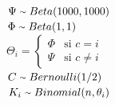 \begin{minipage}[t]{\dimexpr\linewidth-5.5cm\relax}
    \raggedleft{}
\end{minipage}\hfill
\begin{minipage}[t]{0.7\textwidth}
  \begin{flushleft}
  \large
    ~\\
    $\Psi \; {\raise.17ex\hbox{$\scriptstyle\sim$}} \; Beta(1000, 1000)$\vspace*{0.3cm} \\
    $\Phi \; {\raise.17ex\hbox{$\scriptstyle\sim$}} \; Beta(1,1)$\vspace*{0.3cm} \\
    $\Theta_{i} = \left\{
	  \begin{array}{ll}
		  \Phi  & \mbox{si } c = i \\
		  \Psi & \mbox{si } c \neq i
	  \end{array}
    \right.$\vspace*{0.3cm} \\
    $C \; {\raise.17ex\hbox{$\scriptstyle\sim$}} \; Bernoulli(1/2)$\vspace*{0.3cm} \\
    $K_{i} \; {\raise.17ex\hbox{$\scriptstyle\sim$}} \; Binomial(n, \theta_{i})$  
  \end{flushleft}  
\end{minipage}

~\\ \\

